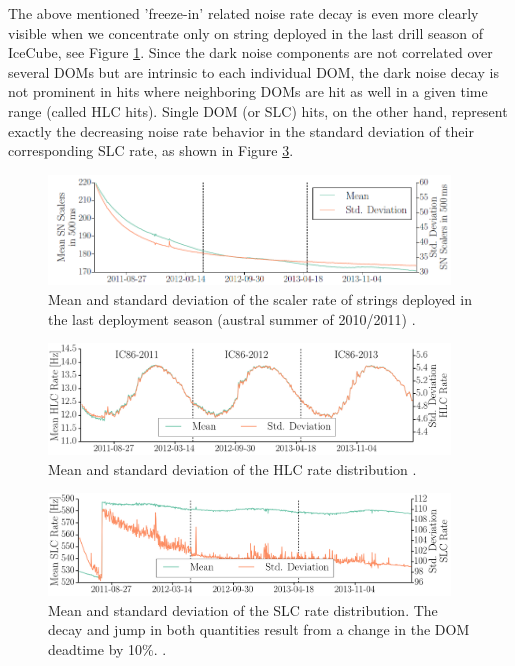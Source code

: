 The above mentioned 'freeze-in' related noise rate decay is even more clearly visible when we concentrate only on string deployed in the last drill season of IceCube, see Figure \ref{fig:noise_over_time_briedel_lastseasondepoyed}. Since the dark noise components are not correlated over several DOMs but are intrinsic to each individual DOM, the dark noise decay is not prominent in hits where neighboring DOMs are hit as well in a given time range (called HLC hits). Single DOM (or SLC) hits, on the other hand, represent exactly the decreasing noise rate behavior in the standard deviation of their corresponding SLC rate, as shown in Figure \ref{fig:slc_over_time_briedel}.

\begin{figure}[!h]
 \centering
 \includegraphics[width=0.95\textwidth]{graphics/dom/performance/darknoise/briedel4.png}
 \caption{Mean and standard deviation of the scaler rate of strings deployed in the last deployment season (austral summer of 2010/2011) \cite{briedel_phd}.}
 \label{fig:noise_over_time_briedel_lastseasondepoyed}
\end{figure}


\begin{figure}[!h]
 \centering
 \includegraphics[width=0.95\textwidth]{graphics/dom/performance/darknoise/briedel2.png}
 \caption{Mean and standard deviation of the HLC rate distribution \cite{briedel_phd}.}
 \label{fig:hlc_over_time_briedel}
\end{figure}

\begin{figure}[!h]
 \centering
 \includegraphics[width=0.95\textwidth]{graphics/dom/performance/darknoise/briedel3.png}
 \caption{Mean and standard deviation of the SLC rate distribution. The decay and jump in both quantities result from a change in the DOM deadtime by 10\%. \cite{briedel_phd}.}
 \label{fig:slc_over_time_briedel}
\end{figure}










